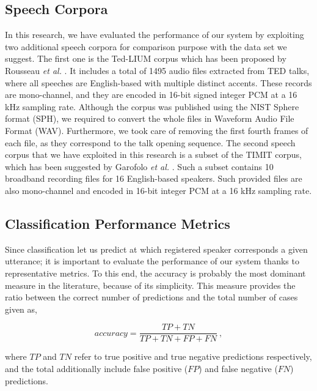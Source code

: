 \documentclass[cryptography,article,submit,moreauthors,pdftex,10pt,a4paper]{mdpi}
\begin{document}
\subsection{Speech Corpora}

In this research, we have evaluated the performance of our system by exploiting two additional speech corpora for comparison purpose with the data set we suggest.
The first one is the Ted-LIUM corpus which has been proposed by Rousseau \textit{et al.} \cite{33}. It includes a total of 1495 audio files extracted from TED talks, where all speeches are English-based with multiple distinct accents. These records are mono-channel, and they are encoded in 16-bit signed integer PCM at a 16 kHz sampling rate. Although the corpus was published using the NIST Sphere format (SPH), we required to convert the whole files in Waveform Audio File Format (WAV). Furthermore, we took care of removing the first fourth frames of each file, as they correspond to the talk opening sequence.
The second speech corpus that we have exploited in this research is a subset of the TIMIT corpus, which has been suggested by Garofolo \textit{et al.} \cite{34}. Such a subset contains 10 broadband recording files for 16 English-based speakers. Such provided files are also mono-channel and encoded in 16-bit integer PCM at a 16 kHz sampling rate.

\subsection{Classification Performance Metrics}

Since classification let us predict at which registered speaker corresponds a given utterance; it is important to evaluate the performance of our system thanks to representative metrics. To this end, the accuracy is probably the most dominant measure in the literature, because of its simplicity. This measure provides the ratio between the correct number of predictions and the total number of cases given as,

\begin{equation}
\label{eq:15}
  	accuracy = \frac{TP+TN}{TP+TN+FP+FN}~,
\end{equation}

\noindent where $TP$ and $TN$ refer to true positive and true negative predictions respectively, and the total additionally include false positive ($FP$) and false negative ($FN$) predictions.
\end{document}
